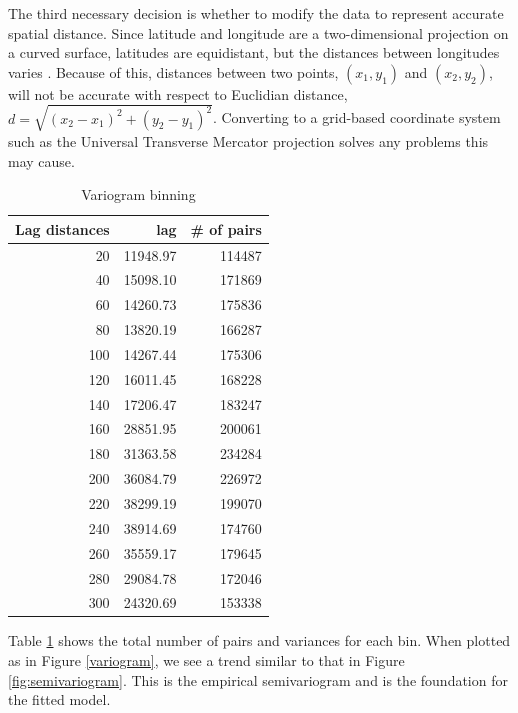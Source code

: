 \documentclass[12pt,twoside]{reedthesis}
\begin{document}
The third necessary decision is whether to modify the data to represent accurate spatial distance. Since latitude and longitude are a two-dimensional projection on a curved surface, latitudes are equidistant, but the distances between longitudes varies \cite{SpatialEpi}. Because of this, distances between two points, $(x_1, y_1)$ and $(x_2, y_2)$, will not be accurate with respect to Euclidian distance, $d = \sqrt{(x_2 - x_1)^2 + (y_2 - y_1)^2}$. Converting to a grid-based coordinate system such as the Universal Transverse Mercator projection solves any problems this may cause. 


\begin{table}[h]

\centering

\begin{tabular}{r|r|r}
\hline
Lag distances & lag & \# of pairs\\
\hline
20 & 11948.97 & 114487\\
\hline
40 & 15098.10 & 171869\\
\hline
60 & 14260.73 & 175836\\
\hline
80 & 13820.19 & 166287\\
\hline
100 & 14267.44 & 175306\\
\hline
120 & 16011.45 & 168228\\
\hline
140 & 17206.47 & 183247\\
\hline
160 & 28851.95 & 200061\\
\hline
180 & 31363.58 & 234284\\
\hline
200 & 36084.79 & 226972\\
\hline
220 & 38299.19 & 199070\\
\hline
240 & 38914.69 & 174760\\
\hline
260 & 35559.17 & 179645\\
\hline
280 & 29084.78 & 172046\\
\hline
300 & 24320.69 & 153338\\
\hline
\end{tabular}

\caption{Variogram binning}
\label{bins}

\end{table}

Table \ref{bins} shows the total number of pairs and variances for each bin. When plotted as in Figure \ref{variogram}, we see a trend similar to that in Figure \ref{fig:semivariogram}. This is the empirical semivariogram and is the foundation for the fitted model.
	
\end{document}
